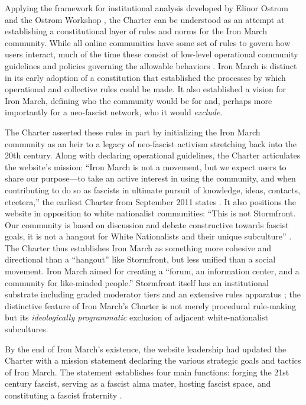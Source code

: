\documentclass[bibtex,autowc,nonblind]{apsr_submission}
\begin{document}
Applying the framework for institutional analysis developed by Elinor Ostrom and the Ostrom Workshop \citep{ostrom1990governing, ostrom2004quest, frey2019_part}, the Charter can be understood as an attempt at establishing a constitutional layer of rules and norms for the Iron March community. While all online communities have some set of rules to govern how users interact, much of the time these consist of low-level operational community guidelines and policies governing the allowable behaviors \citep{frey2019_part, schneider2022}. Iron March is distinct in its early adoption of a constitution that established the processes by which operational and collective rules could be made. It also established a vision for Iron March, defining who the community would be for and, perhaps more importantly for a neo-fascist network, who it would \textit{exclude}.

The Charter asserted these rules in part by initializing the Iron March community as an heir to a legacy of neo-fascist activism stretching back into the 20th century. Along with declaring operational guidelines, the Charter articulates the website's mission: ``Iron March is not a movement, but we expect users to share our purpose---to take an active interest in using the community, and when contributing to do so as fascists in ultimate pursuit of knowledge, ideas, contacts, etcetera,'' the earliest Charter from September 2011 states \citep{charter2011}. It also positions the website in opposition to white nationalist communities: ``This is not Stormfront. Our community is based on discussion and debate constructive towards fascist goals, it is not a hangout for White Nationalists and their unique subculture'' \citep{charter2011}. The Charter thus establishes Iron March as something more cohesive and directional than a ``hangout'' like Stormfront, but less unified than a social movement. Iron March aimed for creating a ``forum, an information center, and a community for like-minded people.'' Stormfront itself has an institutional substrate including graded moderator tiers and an extensive rules apparatus \citep{bowman2009, caren2012social}; the distinctive feature of Iron March's Charter is not merely procedural rule-making but its \textit{ideologically programmatic} exclusion of adjacent white-nationalist subcultures.

By the end of Iron March's existence, the website leadership had updated the Charter with a mission statement declaring the various strategic goals and tactics of Iron March. The statement establishes four main functions: forging the 21st century fascist, serving as a fascist alma mater, hosting fascist space, and constituting a fascist fraternity \citep{charter2017}.
\end{document}
